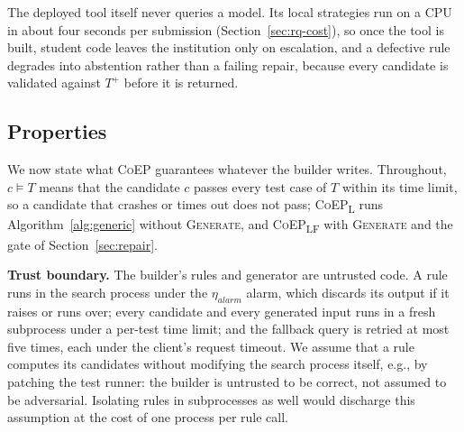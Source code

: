 \documentclass[acmsmall,screen,review,anonymous,nonacm]{acmart}
\newcommand{\tool}{\textsc{CoEP}\xspace}
\newcommand{\coepL}{\textsc{CoEP}\textsubscript{L}\xspace}
\newcommand{\coepLF}{\textsc{CoEP}\textsubscript{LF}\xspace}
\newcommand{\Fn}[1]{\textsc{#1}}
\newcommand{\V}[1]{\ensuremath{\mathit{#1}}}
\begin{document}
The deployed tool itself never queries a model. Its local strategies run on a CPU in about four seconds per submission (Section~\ref{sec:rq-cost}), so once the tool is built, student code leaves the institution only on escalation, and a defective rule degrades into abstention rather than a failing repair, because every candidate is validated against $T^{+}$ before it is returned.

\subsection{Properties}
\label{sec:props}

We now state what \tool guarantees whatever the builder writes. Throughout, $c \models T$ means that the candidate $c$ passes every test case of $T$ within its time limit, so a candidate that crashes or times out does not pass; \coepL runs Algorithm~\ref{alg:generic} without \Fn{Generate}, and \coepLF with \Fn{Generate} and the gate of Section~\ref{sec:repair}.

\textbf{Trust boundary.} The builder's rules and generator are untrusted code. A rule runs in the search process under the $\eta_{\V{alarm}}$ alarm, which discards its output if it raises or runs over; every candidate and every generated input runs in a fresh subprocess under a per-test time limit; and the fallback query is retried at most five times, each under the client's request timeout. We assume that a rule computes its candidates without modifying the search process itself, e.g., by patching the test runner: the builder is untrusted to be correct, not assumed to be adversarial. Isolating rules in subprocesses as well would discharge this assumption at the cost of one process per rule call.
\end{document}
